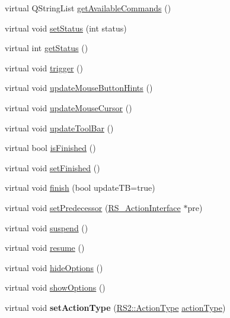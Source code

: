 \begin{DoxyCompactItemize}
\item 
virtual Q\-String\-List \hyperlink{classRS__ActionInterface_acafdac8d18d3f053eda872581fb3e27d}{get\-Available\-Commands} ()
\item 
virtual void \hyperlink{classRS__ActionInterface_a3a2bf4cbc06f6507ca83c5d105269b90}{set\-Status} (int status)
\item 
virtual int \hyperlink{classRS__ActionInterface_a304c9fa2bc6b72c4e02242b7eda8da34}{get\-Status} ()
\item 
virtual void \hyperlink{classRS__ActionInterface_aa2ba8f6f697f735eace4ec5449c0b8cd}{trigger} ()
\item 
virtual void \hyperlink{classRS__ActionInterface_a16c2d17c24c1131d88360abbdfcc1d63}{update\-Mouse\-Button\-Hints} ()
\item 
virtual void \hyperlink{classRS__ActionInterface_af1a8d898a8bf0521295d7c45d80e6d09}{update\-Mouse\-Cursor} ()
\item 
virtual void \hyperlink{classRS__ActionInterface_a25ec66468e5b09483afccd2358877361}{update\-Tool\-Bar} ()
\item 
virtual bool \hyperlink{classRS__ActionInterface_a6786d97e7a33787c455531f3d413fd1b}{is\-Finished} ()
\item 
virtual void \hyperlink{classRS__ActionInterface_afdaaf24d99cdfffa167540a453ca924b}{set\-Finished} ()
\item 
virtual void \hyperlink{classRS__ActionInterface_a63768bfe3a17d972be51f1800406e952}{finish} (bool update\-T\-B=true)
\item 
virtual void \hyperlink{classRS__ActionInterface_a6589a443da678369f3a49fdb9131cf85}{set\-Predecessor} (\hyperlink{classRS__ActionInterface}{R\-S\-\_\-\-Action\-Interface} $\ast$pre)
\item 
virtual void \hyperlink{classRS__ActionInterface_a7f4a0d32f846b52728b10c9dbaab6c78}{suspend} ()
\item 
virtual void \hyperlink{classRS__ActionInterface_ae82ff598b25d54f624325553f8b680a7}{resume} ()
\item 
virtual void \hyperlink{classRS__ActionInterface_adca8d2f958d687e08f6d4477ef0fa43a}{hide\-Options} ()
\item 
virtual void \hyperlink{classRS__ActionInterface_add4bb135e4be51bd0dc169e0e7b9e695}{show\-Options} ()
\item 
\hypertarget{classRS__ActionInterface_ac4d89b0bd4b2a5f09b40b77edd7b0565}{virtual void {\bfseries set\-Action\-Type} (\hyperlink{classRS2_afe3523e0bc41fd637b892321cfc4b9d7}{R\-S2\-::\-Action\-Type} \hyperlink{classRS__ActionInterface_ad040e10c710fc045051175336b50fda0}{action\-Type})}\label{classRS__ActionInterface_ac4d89b0bd4b2a5f09b40b77edd7b0565}


\end{DoxyCompactItemize}

